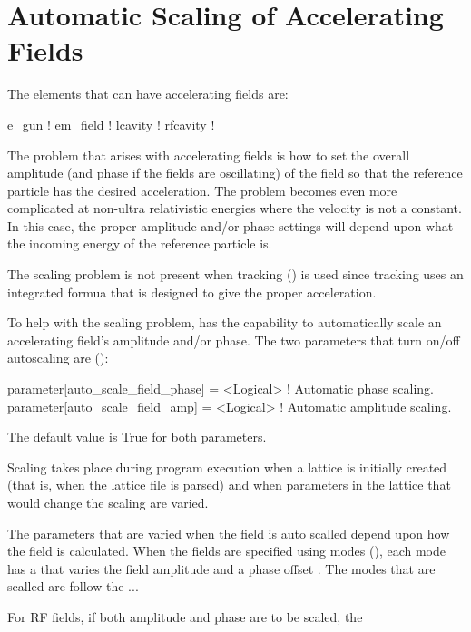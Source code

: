 \chapter{Automatic Scaling of Accelerating Fields}
\label{c:autoscale}

The elements that can have accelerating fields are:
\begin{example}
  e_gun       ! 
  em_field    ! 
  lcavity     ! 
  rfcavity    ! 
\end{example}

The problem that arises with accelerating fields is how to set the
overall amplitude (and phase if the fields are oscillating) of the
field so that the reference particle has the desired acceleration. The
problem becomes even more complicated at non-ultra relativistic
energies where the velocity is not a constant. In this case, the
proper amplitude and/or phase settings will depend upon what the
incoming energy of the reference particle is.

The scaling problem is not present when  tracking
() is used since  tracking uses an
integrated formua that is designed to give the proper acceleration.

To help with the scaling problem, \bmad has the capability to automatically
scale an accelerating field's amplitude and/or phase. The two
parameters that turn on/off autoscaling are ():
\begin{example}
  parameter[auto_scale_field_phase]    = <Logical>  ! Automatic phase scaling.
  parameter[auto_scale_field_amp]      = <Logical>  ! Automatic amplitude scaling.
\end{example}
The default value is True for both parameters. 

Scaling takes place during program execution when a lattice is
initially created (that is, when the lattice file is parsed) and when
parameters in the lattice that would change the scaling are varied.

The parameters that are varied when the field is auto scalled depend
upon how the field is calculated. When the fields are specified using
modes (), each mode has a  that
varies the field amplitude and a phase offset . The modes
that are scalled are follow the ...


For RF fields, if both amplitude and phase are to be scaled, the 









